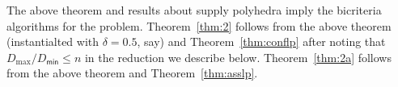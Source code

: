 %
The above theorem and results about supply polyhedra imply the bicriteria algorithms for the \mckc problem.
Theorem~\ref{thm:2} follows from the above theorem (instantialted with $\delta = 0.5$, say) and Theorem~\ref{thm:conflp} after noting that $D_\mathrm{max}/D_\mathsf{min} \leq n$ in the reduction we describe below. Theorem~\ref{thm:2a} follows
from the above theorem and Theorem~\ref{thm:asslp}. 

